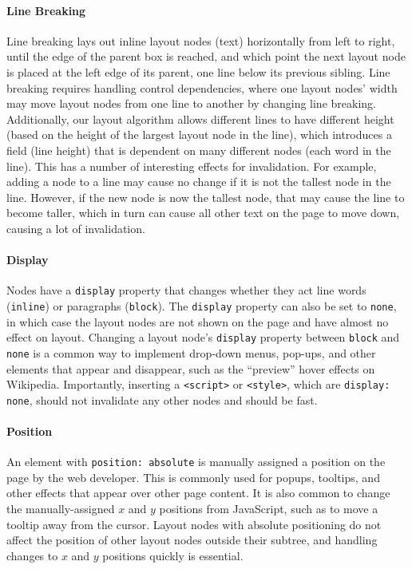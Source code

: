 \paragraph{Line Breaking}
Line breaking lays out inline layout nodes (text)
  horizontally from left to right,
  until the edge of the parent box is reached,
  and which point the next layout node is placed
  at the left edge of its parent,
  one line below its previous sibling.
Line breaking requires handling control dependencies,
  where one layout nodes' width may move layout nodes
  from one line to another by changing line breaking.
Additionally, our layout algorithm
  allows different lines to have different height
  (based on the height of the largest layout node in the line),
  which introduces a field (line height)
  that is dependent on many different nodes (each word in the line).
This has a number of interesting effects for invalidation.
For example, adding a node to a line
  may cause no change if it is not the tallest node in the line.
However, if the new node is now the tallest node,
  that may cause the line to become taller,
  which in turn can cause all other text on the page to move down,
  causing a lot of invalidation.

\paragraph{Display}
Nodes have a \texttt{display} property that changes
  whether they act line words (\texttt{inline})
  or paragraphs (\texttt{block}).
The \texttt{display} property can also be set to \texttt{none},
  in which case the layout nodes are not shown on the page
  and have almost no effect on layout.
Changing a layout node's \texttt{display} property
  between \texttt{block} and \texttt{none}
  is a common way to implement drop-down menus,
  pop-ups, and other elements that appear and disappear,
  such as the ``preview'' hover effects on Wikipedia.
Importantly,
  inserting a \texttt{<script>} or \texttt{<style>},
  which are \texttt{display: none},
  should not invalidate any other nodes and should be fast.
  
\paragraph{Position}
An element with \texttt{position: absolute}
  is manually assigned a position on the page
  by the web developer.
This is commonly used for popups, tooltips, and other effects
  that appear over other page content.
It is also common
  to change the manually-assigned $x$ and $y$ positions
  from JavaScript, such as to move a tooltip away from the cursor.
Layout nodes with absolute positioning do not affect
  the position of other layout nodes outside their subtree,
  and handling changes to $x$ and $y$ positions quickly
  is essential.

